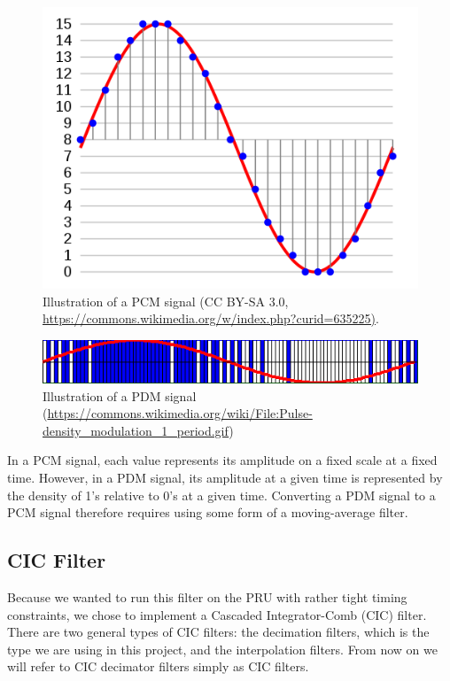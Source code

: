 \documentclass[]{report}
\begin{document}
\begin{figure}[H]
\centering
\includegraphics[width=0.7\linewidth]{Pictures/PCM.png}
\caption{Illustration of a PCM signal (CC BY-SA 3.0, \url{https://commons.wikimedia.org/w/index.php?curid=635225)}.}
\end{figure}

\begin{figure}[H]
\centering
\includegraphics[width=1.0\linewidth]{Pictures/PDM.png}
\caption{Illustration of a PDM signal (\url{https://commons.wikimedia.org/wiki/File:Pulse-density_modulation_1_period.gif})}
\end{figure}

In a PCM signal, each value represents its amplitude on a fixed scale at a fixed time. However, in a PDM signal, its amplitude at a given time is represented by the density of 1's relative to 0's at a given time. Converting a PDM signal to a PCM signal therefore requires using some form of a moving-average filter.

\hypertarget{cic-filter}{%
\subsection{CIC Filter}\label{cic-filter}}

Because we wanted to run this filter on the PRU with rather tight timing constraints, we chose to implement a Cascaded Integrator-Comb (CIC) filter. There are two general types of CIC filters: the decimation filters, which is the type we are using in this project, and the interpolation filters. From now on we will refer to CIC decimator filters simply as CIC filters.
\end{document}
